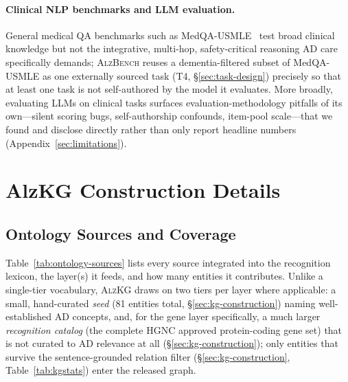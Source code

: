 \documentclass{article}
\begin{document}
\paragraph{Clinical NLP benchmarks and LLM evaluation.} General medical QA benchmarks such as MedQA-USMLE~\citep{jin2021medqa} test broad clinical knowledge but not the integrative, multi-hop, safety-critical reasoning AD care specifically demands; \textsc{AlzBench} reuses a dementia-filtered subset of MedQA-USMLE as one externally sourced task (T4, \S\ref{sec:task-design}) precisely so that at least one task is not self-authored by the model it evaluates. More broadly, evaluating LLMs on clinical tasks surfaces evaluation-methodology pitfalls of its own---silent scoring bugs, self-authorship confounds, item-pool scale---that we found and disclose directly rather than only report headline numbers (Appendix~\ref{sec:limitations}).

\newpage
\section{AlzKG Construction Details}
\label{app:kg-details}

\subsection{Ontology Sources and Coverage}
\label{app:ontology-sources}
Table~\ref{tab:ontology-sources} lists every source integrated into the recognition lexicon, the layer(s) it feeds, and how many entities it contributes. Unlike a single-tier vocabulary, \textsc{AlzKG} draws on two tiers per layer where applicable: a small, hand-curated \emph{seed} (81 entities total, \S\ref{sec:kg-construction}) naming well-established AD concepts, and, for the gene layer specifically, a much larger \emph{recognition catalog} (the complete HGNC approved protein-coding gene set) that is not curated to AD relevance at all (\S\ref{sec:kg-construction}); only entities that survive the sentence-grounded relation filter (\S\ref{sec:kg-construction}, Table~\ref{tab:kgstats}) enter the released graph.
\end{document}

